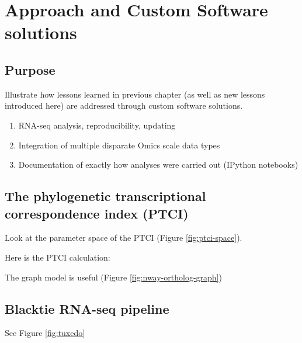 
\chapter{Approach and Custom Software solutions} \label{chap:3}

\section{Purpose}
Illustrate how lessons learned in previous chapter (as well as new lessons introduced here) are addressed through custom software solutions.
\begin{enumerate}
 \item RNA-seq analysis, reproducibility, updating
 \item Integration of multiple disparate Omics scale data types
 \item Documentation of exactly how analyses were carried out (IPython notebooks)
\end{enumerate}


\section{The phylogenetic transcriptional correspondence index (PTCI)}








Look at the parameter space of the PTCI (Figure \ref{fig:ptci-space}).  


Here is the PTCI calculation:


The graph model is useful (Figure \ref{fig:nway-ortholog-graph})




\pagebreak[4]
\section{Blacktie RNA-seq pipeline}

See Figure \ref{fig:tuxedo}








